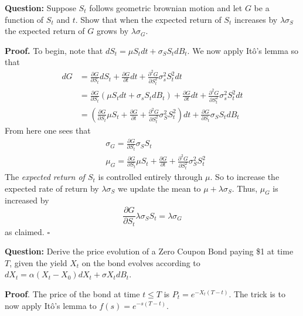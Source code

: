 \documentclass{article}
\begin{document}
\begin{tcolorbox}[colframe=black,colback=gray!5,boxrule=0.5pt]
\textbf{Question:} Suppose $S_t$ follows geometric brownian motion and let $G$ be a function of $S_t$ and $t$. Show that when the expected return of $S_t$ increases by $\lambda \sigma _S$ the expected return of $G$ grows by $\lambda \sigma _G$. \cite{Hull}
\end{tcolorbox}
\textbf{Proof.} To begin, note that $dS_t = \mu S_t dt + \sigma_S S_tdB_t$. We now apply Itô's lemma so that 
\begin{align*}
   dG &= \frac{\partial G}{\partial S_t}dS_t + \frac{\partial G}{\partial t}dt + \frac{\partial^2 G}{\partial S_t^2}\sigma^2_s S_t^2dt  \\
   &= \frac{\partial G}{\partial S_t}(\mu S_t dt + \sigma_sS_tdB_t) + \frac{\partial G}{\partial t}dt + \frac{\partial^2 G}{\partial S_t^2}\sigma^2_s S_t^2dt \\
   &= \left(\frac{\partial G}{\partial S_t}\mu S_t + \frac{\partial G}{\partial t} + \frac{\partial^2 G}{\partial S_t^2}\sigma_S^2S_t^2\right)dt + \frac{\partial G}{\partial S_t}\sigma_S S_t dB_t
\end{align*}
From here one sees that 
\begin{align*}
     & \sigma_G = \frac{\partial G}{\partial S_t}\sigma_S S_t \\
    & \mu_G  = \frac{\partial G}{\partial S_t}\mu S_t + \frac{\partial G}{\partial t} + \frac{\partial^2 G}{\partial S_t^2}\sigma_S^2S_t^2
\end{align*}
The \textit{expected return of $S_t$} is controlled entirely through $\mu$. So to increase the expected rate of return by $\lambda\sigma_S$ we update the mean to $\mu + \lambda\sigma_S$. Thus, $\mu_G$ is increased by
$$\frac{\partial G}{\partial S_t}\lambda\sigma_S S_t = \lambda\sigma_G$$
as claimed. $\square$
 
\begin{tcolorbox}[colframe=black,colback=gray!5,boxrule=0.5pt]
\textbf{Question:} Derive the price evolution of a Zero Coupon Bond paying \$1 at time $T$, given the yield $X_t$ on the bond evolves according to $dX_t = \alpha(X_t-X_0)dX_t + \sigma X_tdB_t$. \cite{Hull}
\end{tcolorbox}
\textbf{Proof}. The price of the bond at time $t\leq T$ is $P_t = e^{-X_t(T-t)}$. The trick is to now apply Itô's lemma to $f(s) = e^{-s(T-t)}$.
\newpage
 
\end{document}
